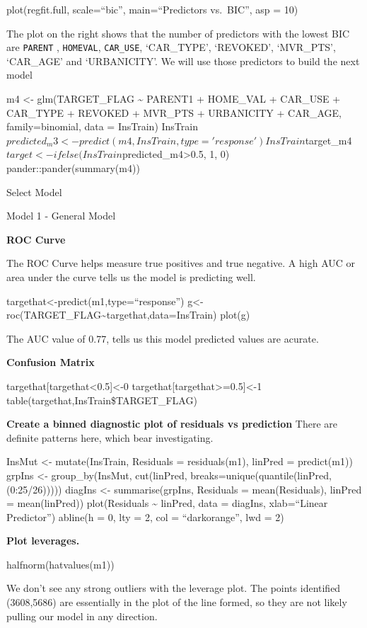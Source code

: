 \documentclass[]{article}
\begin{document}
plot(regfit.full, scale=``bic'', main=``Predictors vs.~BIC'', asp = 10)

The plot on the right shows that the number of predictors with the
lowest BIC are \texttt{PARENT} , \texttt{HOMEVAL}, \texttt{CAR\_USE},
`CAR\_TYPE', `REVOKED', `MVR\_PTS', `CAR\_AGE' and `URBANICITY'. We will
use those predictors to build the next model

m4 \textless- glm(TARGET\_FLAG \textasciitilde{} PARENT1 + HOME\_VAL +
CAR\_USE + CAR\_TYPE + REVOKED + MVR\_PTS + URBANICITY + CAR\_AGE,
family=binomial, data = InsTrain)
InsTrain\(predicted_m3<- predict(m4, InsTrain, type='response') InsTrain\)target\_m4\(target <- ifelse(InsTrain\)predicted\_m4\textgreater0.5,
1, 0) pander::pander(summary(m4))

Select Model

Model 1 - General Model

\textbf{ROC Curve}

The ROC Curve helps measure true positives and true negative. A high AUC
or area under the curve tells us the model is predicting well.

targethat\textless-predict(m1,type=``response'')
g\textless-roc(TARGET\_FLAG\textasciitilde targethat,data=InsTrain)
plot(g)

The AUC value of 0.77, tells us this model predicted values are acurate.

\textbf{Confusion Matrix}

targethat{[}targethat\textless0.5{]}\textless-0
targethat{[}targethat\textgreater=0.5{]}\textless-1
table(targethat,InsTrain\$TARGET\_FLAG)

\textbf{Create a binned diagnostic plot of residuals vs prediction}
There are definite patterns here, which bear investigating.

InsMut \textless- mutate(InsTrain, Residuals = residuals(m1), linPred =
predict(m1)) grpIns \textless- group\_by(InsMut, cut(linPred,
breaks=unique(quantile(linPred, (0:25/26))))) diagIns \textless-
summarise(grpIns, Residuals = mean(Residuals), linPred = mean(linPred))
plot(Residuals \textasciitilde{} linPred, data = diagIns, xlab=``Linear
Predictor'') abline(h = 0, lty = 2, col = ``darkorange'', lwd = 2)

\textbf{Plot leverages.}

halfnorm(hatvalues(m1))

We don't see any strong outliers with the leverage plot. The points
identified (3608,5686) are essentially in the plot of the line formed,
so they are not likely pulling our model in any direction.
\end{document}

